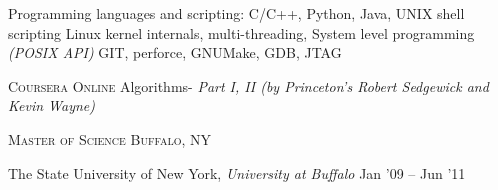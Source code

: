 \documentclass[10pt,a4paper]{article} %
\begin{document}

\inlineheadsection %
{Programming languages and scripting:} {C/C++, Python, Java, UNIX shell scripting}
 {Linux kernel internals, multi-threading, System level programming \textit{(POSIX API)}}
 {GIT, perforce, GNUMake, GDB, JTAG}
{}

%

\spacedhrule{0.5em}{-0.4em} %


\headedsection %
{\textsc{Coursera}} {\textsc{Online}} {
  \headedsubsection %
  {Algorithms- \textit{Part I, II (by Princeton's Robert Sedgewick and Kevin Wayne)}}
  {} {
	\\
  }\vspace{-1.0em}
}

\headedsection %
{\textsc{Master of Science}}
{\textsc{Buffalo, NY}} {

  \headedsubsection %
	{The State University of New York, \textit{University at Buffalo}} 
	{Jan '09 -- Jun '11} {}
}
\end{document}
